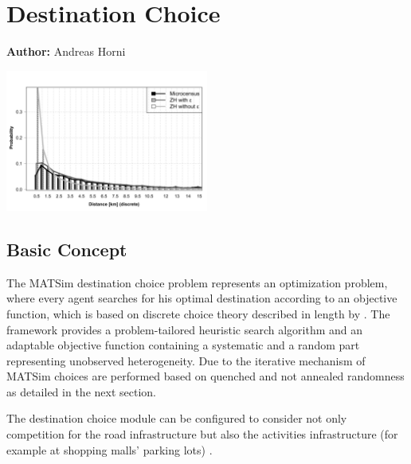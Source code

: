 \chapter{Destination Choice}
\label{ch:destinationchoice}
\hfill \textbf{Author:} Andreas Horni

\begin{center} \includegraphics[width=0.5\textwidth, angle=0]{extending/figures/dc/zhLeisure.pdf} \end{center}

\section{Basic Concept}
The MATSim destination choice problem represents an optimization problem, where every agent searches for his optimal destination according to an objective function, which is based on discrete choice theory described in length by \citet[][]{Horni_PhDThesis_2013, HorniEtAl_unpub_TRB_2012}. The framework provides a problem-tailored heuristic search algorithm and an adaptable objective function containing a systematic and a random part representing unobserved heterogeneity. Due to the iterative mechanism of MATSim choices are performed based on quenched and not annealed randomness as detailed in the next section. 

The destination choice module can be configured to consider not only competition for the road infrastructure but also the activities infrastructure (for example at shopping malls' parking lots) \citep[][]{HorniEtAl_TRR_2009}.


